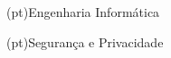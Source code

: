 %
%
%
%
\ntdegreename*(pt){Engenharia Informática} %



%
%
%
%
\ntspecialization*(pt){Segurança e Privacidade} %



%
%
%
%
%
%






